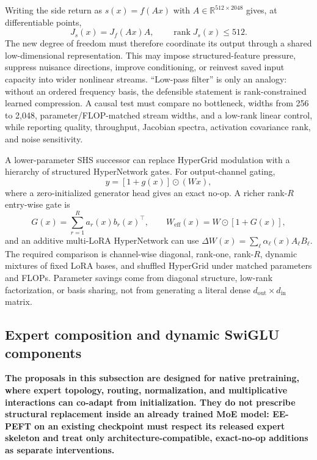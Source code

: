 \documentclass[10pt]{article}
\begin{document}
Writing the side return as $s(x)=f(Ax)$ with
$A\in\mathbb{R}^{512\times 2048}$ gives, at differentiable points,
\begin{equation}
  J_s(x)=J_f(Ax)A,
  \qquad \operatorname{rank}J_s(x)\leq 512.
\end{equation}
The new degree of freedom must therefore coordinate its output through a
shared low-dimensional representation.  This may impose structured-feature
pressure, suppress nuisance directions, improve conditioning, or reinvest
saved input capacity into wider nonlinear streams.  ``Low-pass filter'' is
only an analogy: without an ordered frequency basis, the defensible statement
is rank-constrained learned compression.  A causal test must compare no
bottleneck, widths from 256 to 2,048, parameter/FLOP-matched stream widths, and
a low-rank linear control, while reporting quality, throughput, Jacobian
spectra, activation covariance rank, and noise sensitivity.

A lower-parameter SHS successor can replace HyperGrid modulation with a
hierarchy of structured HyperNetwork gates.  For output-channel gating,
\begin{equation}
  y=[1+g(x)]\odot(Wx),
\end{equation}
where a zero-initialized generator head gives an exact no-op.  A richer
rank-$R$ entry-wise gate is
\begin{equation}
  G(x)=\sum_{r=1}^{R}a_r(x)b_r(x)^\top,
  \qquad W_{\mathrm{eff}}(x)=W\odot[1+G(x)],
\end{equation}
and an additive multi-LoRA HyperNetwork can use
$\Delta W(x)=\sum_{\ell}\alpha_\ell(x)A_\ell B_\ell$.  The required comparison
is channel-wise diagonal, rank-one, rank-$R$, dynamic mixtures of fixed LoRA
bases, and shuffled HyperGrid under matched parameters and FLOPs.  Parameter
savings come from diagonal structure, low-rank factorization, or basis sharing,
not from generating a literal dense $d_{\mathrm{out}}\times d_{\mathrm{in}}$
matrix.

\subsection{Expert composition and dynamic SwiGLU components}

\textbf{The proposals in this subsection are designed for native pretraining,
where expert topology, routing, normalization, and multiplicative interactions
can co-adapt from initialization.  They do not prescribe structural replacement
inside an already trained MoE model: EE-PEFT on an existing checkpoint must
respect its released expert skeleton and treat only architecture-compatible,
exact-no-op additions as separate interventions.}
\end{document}
